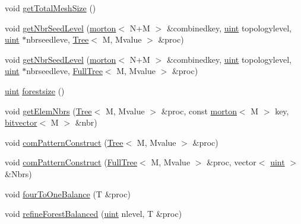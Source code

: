 \begin{DoxyCompactItemize}
\item 
void \mbox{\hyperlink{classTemplateForest_a77c9dba6818f98a45bcb10db4f8c7455}{get\+Total\+Mesh\+Size}} ()
\item 
void \mbox{\hyperlink{classTemplateForest_a6ce3bbf28ceb4e78324aaf8706fedc92}{get\+Nbr\+Seed\+Level}} (\mbox{\hyperlink{definitions_8h_af8682350bd8bb38ee9023f7a0a310add}{morton}}$<$ N+M $>$ \&combinedkey, \mbox{\hyperlink{definitions_8h_a69aa29b598b851b0640aa225a9e5d61d}{uint}} topologylevel, \mbox{\hyperlink{definitions_8h_a69aa29b598b851b0640aa225a9e5d61d}{uint}} $\ast$nbrseedleve, \mbox{\hyperlink{classTree}{Tree}}$<$ M, Mvalue $>$ \&proc)
\item 
void \mbox{\hyperlink{classTemplateForest_afe03a79ad5dbcbce96df1f7bdcac7e66}{get\+Nbr\+Seed\+Level}} (\mbox{\hyperlink{definitions_8h_af8682350bd8bb38ee9023f7a0a310add}{morton}}$<$ N+M $>$ \&combinedkey, \mbox{\hyperlink{definitions_8h_a69aa29b598b851b0640aa225a9e5d61d}{uint}} topologylevel, \mbox{\hyperlink{definitions_8h_a69aa29b598b851b0640aa225a9e5d61d}{uint}} $\ast$nbrseedleve, \mbox{\hyperlink{classFullTree}{Full\+Tree}}$<$ M, Mvalue $>$ \&proc)
\item 
\mbox{\hyperlink{definitions_8h_a69aa29b598b851b0640aa225a9e5d61d}{uint}} \mbox{\hyperlink{classTemplateForest_a832fb663d114e9fc75ac8bc965a77d66}{forestsize}} ()
\item 
void \mbox{\hyperlink{classTemplateForest_af8b358bae287aa4d0536988f56c6e07f}{get\+Elem\+Nbrs}} (\mbox{\hyperlink{classTree}{Tree}}$<$ M, Mvalue $>$ \&proc, const \mbox{\hyperlink{definitions_8h_af8682350bd8bb38ee9023f7a0a310add}{morton}}$<$ M $>$ key, \mbox{\hyperlink{definitions_8h_a55821d7929f3f16aaf1466129c209492}{bitvector}}$<$ M $>$ \&nbr)
\item 
void \mbox{\hyperlink{classTemplateForest_aa8695400b06ec321a3378ea68dafe4a9}{com\+Pattern\+Construct}} (\mbox{\hyperlink{classTree}{Tree}}$<$ M, Mvalue $>$ \&proc)
\item 
void \mbox{\hyperlink{classTemplateForest_a797a20798c773480c74f6a4c410d6de3}{com\+Pattern\+Construct}} (\mbox{\hyperlink{classFullTree}{Full\+Tree}}$<$ M, Mvalue $>$ \&proc, vector$<$ \mbox{\hyperlink{definitions_8h_a69aa29b598b851b0640aa225a9e5d61d}{uint}} $>$ \&Nbrs)
\item 
void \mbox{\hyperlink{classTemplateForest_abba9b72e8699f78570c73bec1b4396d1}{four\+To\+One\+Balance}} (T \&proc)
\item 
void \mbox{\hyperlink{classTemplateForest_a9d7144f8471d28d1412ab85363566a56}{refine\+Forest\+Balanced}} (\mbox{\hyperlink{definitions_8h_a69aa29b598b851b0640aa225a9e5d61d}{uint}} nlevel, T \&proc)

\end{DoxyCompactItemize}
